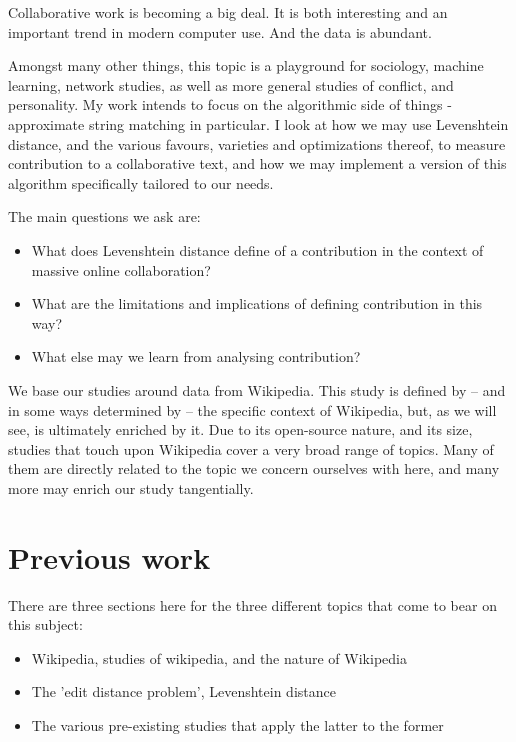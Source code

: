 \documentclass[a4paper,11pt,twoside,notitlepage]{article}
\begin{document}
        Collaborative work is becoming a big deal. It is both
        interesting and an important trend in modern computer
        use. And the data is abundant. 

        Amongst many other things, this topic is a playground for
        sociology, machine learning, network studies, as well as more
        general studies of conflict, and personality. My work intends
        to focus on the algorithmic side of things - approximate
        string matching in particular. I look at how we may use
        Levenshtein distance, and the various favours,
        varieties and optimizations thereof, to measure contribution
        to a collaborative text, and how we may implement a version of
        this algorithm specifically tailored to our needs.

        The main questions we ask are:
        \begin{itemize}
          \item What does Levenshtein distance define of a
            contribution in the context of massive online
            collaboration?
          \item What are the limitations and implications of defining
            contribution in this way?
          \item What else may we learn from analysing contribution? 
        \end{itemize}

        We base our studies around data from Wikipedia. This study is
        defined by -- and in some ways determined by -- the specific
        context of Wikipedia, but, as we will see, is ultimately
        enriched by it. Due to its open-source nature, and its size,
        studies that touch upon Wikipedia cover a very broad range of
        topics. Many of them are directly related to the topic we
        concern ourselves with here, and many more may enrich our
        study tangentially. 
 
        \section{Previous work}
        There are three sections here for the three different topics
        that come to bear on this subject:
        \begin{itemize}
          \item Wikipedia, studies of wikipedia, and the nature of
            Wikipedia
          \item The 'edit distance problem', Levenshtein distance
          \item The various pre-existing studies that apply the latter
            to the former
        \end{itemize}
        
\end{document}
